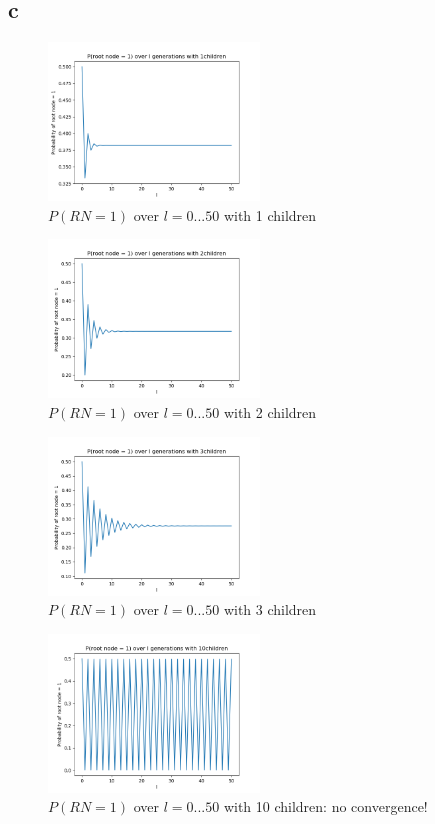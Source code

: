 \documentclass[12pt]{article}
\begin{document}
\subsection{c}
\begin{figure}[H]
	\includegraphics[width=0.5\textwidth]{p2_4_1.png}
	\caption{$P(RN=1)$ over $l = 0...50$ with 1 children}
\end{figure}
\begin{figure}[H]
	\includegraphics[width=0.5\textwidth]{p2_4_2.png}
	\caption{$P(RN=1)$ over $l = 0...50$ with 2 children}
\end{figure}
\begin{figure}[H]
	\includegraphics[width=0.5\textwidth]{p2_4_3.png}
	\caption{$P(RN=1)$ over $l = 0...50$ with 3 children}
\end{figure}
\begin{figure}[H]
	\includegraphics[width=0.5\textwidth]{p2_4_10.png}
	\caption{$P(RN=1)$ over $l = 0...50$ with 10 children: no convergence!}
\end{figure}
\end{document}
